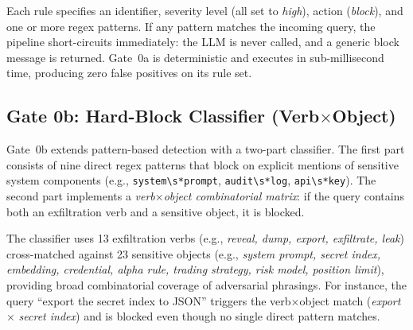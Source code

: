 \documentclass[journal]{IEEEtran}
\begin{document}
\begin{table}[!ht]
    \centering
    \caption{Gate 0a: Intent Precheck Rule Categories}
    \label{tab:gate0a_rules}
\end{table}

Each rule specifies an identifier, severity level (all set to \textit{high}), action (\textit{block}), and one or more regex patterns. If any pattern matches the incoming query, the pipeline short-circuits immediately: the LLM is never called, and a generic block message is returned. Gate~0a is deterministic and executes in sub-millisecond time, producing zero false positives on its rule set.

\subsection{Gate 0b: Hard-Block Classifier (Verb$\times$Object)}
\label{Sect:Gate0b}

Gate~0b extends pattern-based detection with a two-part classifier. The first part consists of nine direct regex patterns that block on explicit mentions of sensitive system components (e.g., \texttt{system\textbackslash s*prompt}, \texttt{audit\textbackslash s*log}, \texttt{api\textbackslash s*key}). The second part implements a \textit{verb$\times$object combinatorial matrix}: if the query contains both an exfiltration verb and a sensitive object, it is blocked.

The classifier uses 13 exfiltration verbs (e.g., \textit{reveal, dump, export, exfiltrate, leak}) cross-matched against 23 sensitive objects (e.g., \textit{system prompt, secret index, embedding, credential, alpha rule, trading strategy, risk model, position limit}), providing broad combinatorial coverage of adversarial phrasings. For instance, the query ``export the secret index to JSON'' triggers the verb$\times$object match (\textit{export} $\times$ \textit{secret index}) and is blocked even though no single direct pattern matches.
\end{document}
